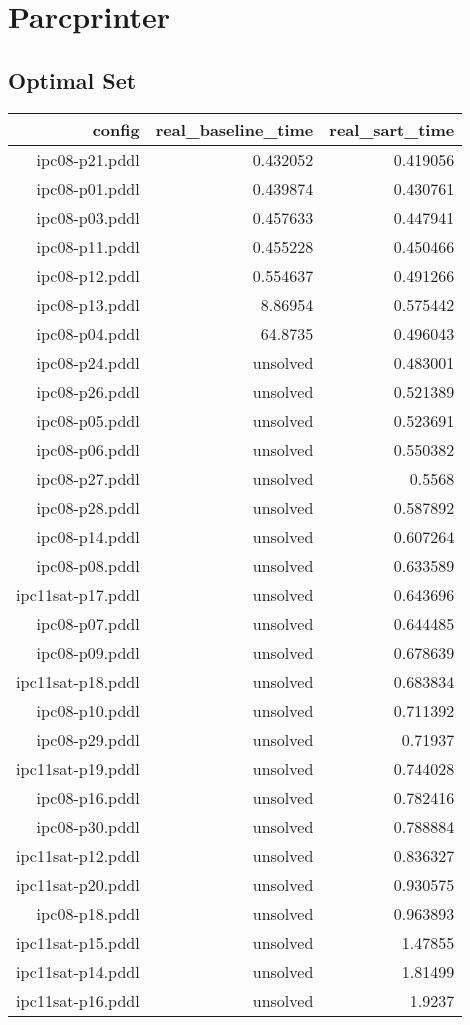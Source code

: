 \documentclass{article}
\begin{document}
                \newpage \section{Parcprinter}
                    \subsection*{Optimal Set}
                    
                            \begin{center}
                            \scriptsize
                            \begin{tabular}{r|r|r}
                            config & real\_baseline\_time & real\_sart\_time\\\midrule
                             ipc08-p21.pddl&0.432052&0.419056\\
 ipc08-p01.pddl&0.439874&0.430761\\
 ipc08-p03.pddl&0.457633&0.447941\\
 ipc08-p11.pddl&0.455228&0.450466\\
 ipc08-p12.pddl&0.554637&0.491266\\
 ipc08-p13.pddl&8.86954&0.575442\\
 ipc08-p04.pddl&64.8735&0.496043\\
 ipc08-p24.pddl&unsolved&0.483001\\
 ipc08-p26.pddl&unsolved&0.521389\\
 ipc08-p05.pddl&unsolved&0.523691\\
 ipc08-p06.pddl&unsolved&0.550382\\
 ipc08-p27.pddl&unsolved&0.5568\\
 ipc08-p28.pddl&unsolved&0.587892\\
 ipc08-p14.pddl&unsolved&0.607264\\
 ipc08-p08.pddl&unsolved&0.633589\\
 ipc11sat-p17.pddl&unsolved&0.643696\\
 ipc08-p07.pddl&unsolved&0.644485\\
 ipc08-p09.pddl&unsolved&0.678639\\
 ipc11sat-p18.pddl&unsolved&0.683834\\
 ipc08-p10.pddl&unsolved&0.711392\\
 ipc08-p29.pddl&unsolved&0.71937\\
 ipc11sat-p19.pddl&unsolved&0.744028\\
 ipc08-p16.pddl&unsolved&0.782416\\
 ipc08-p30.pddl&unsolved&0.788884\\
 ipc11sat-p12.pddl&unsolved&0.836327\\
 ipc11sat-p20.pddl&unsolved&0.930575\\
 ipc08-p18.pddl&unsolved&0.963893\\
 ipc11sat-p15.pddl&unsolved&1.47855\\
 ipc11sat-p14.pddl&unsolved&1.81499\\
 ipc11sat-p16.pddl&unsolved&1.9237
                            \end{tabular}
                            \end{center}
                    
\end{document}
